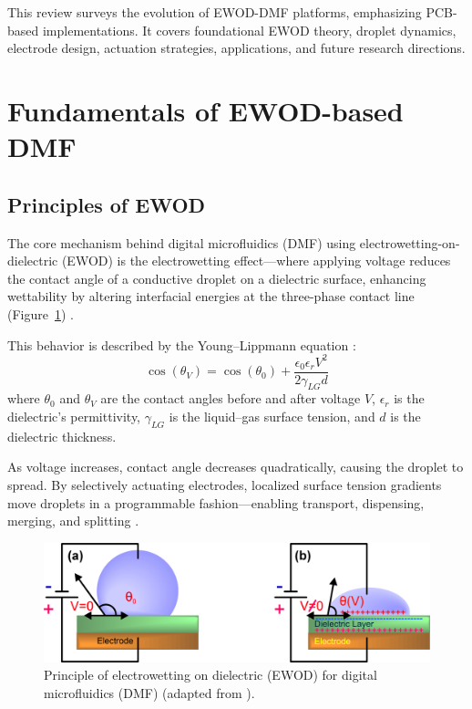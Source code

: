 \documentclass[conference,a4paper]{IEEEtran}
\begin{document}
This review surveys the evolution of EWOD-DMF platforms, emphasizing PCB-based implementations. It covers foundational EWOD theory, droplet dynamics, electrode design, actuation strategies, applications, and future research directions.\section{Fundamentals of EWOD-based DMF}

\subsection{Principles of EWOD}
The core mechanism behind digital microfluidics (DMF) using electrowetting-on-dielectric (EWOD) is the electrowetting effect—where applying voltage reduces the contact angle of a conductive droplet on a dielectric surface, enhancing wettability by altering interfacial energies at the three-phase contact line (Figure~\ref{ewod_principle}) \cite{royFeedbackBasedAutomated2013,bhattacharjeeMultipleDilutionSample2012,jainDesignFabricationCharacterization2017}.

This behavior is described by the Young–Lippmann equation \cite{jainDesignFabricationCharacterization2017}:
\begin{equation}\label{young_lippmann}
\cos(\theta_{V}) = \cos(\theta_{0}) + \frac{\epsilon_{0}\epsilon_{r} V^{2}}{2\gamma_{LG} d}
\end{equation}
\noindent where $\theta_0$ and $\theta_V$ are the contact angles before and after voltage $V$, $\epsilon_r$ is the dielectric’s permittivity, $\gamma_{LG}$ is the liquid–gas surface tension, and $d$ is the dielectric thickness.

As voltage increases, contact angle decreases quadratically, causing the droplet to spread. By selectively actuating electrodes, localized surface tension gradients move droplets in a programmable fashion—enabling transport, dispensing, merging, and splitting \cite{lovelessCompilingFunctionsDigital2023,jainDesignFabricationCharacterization2017}.

\begin{figure}[h!]
\centering
\includegraphics[width=0.85\linewidth]{ContactAngleWhenActuated.png}
\caption{Principle of electrowetting on dielectric (EWOD) for digital microfluidics (DMF) (adapted from \cite{jainEffectElectrodeGeometry2017}).}
\label{ewod_principle}
\end{figure}
\end{document}
